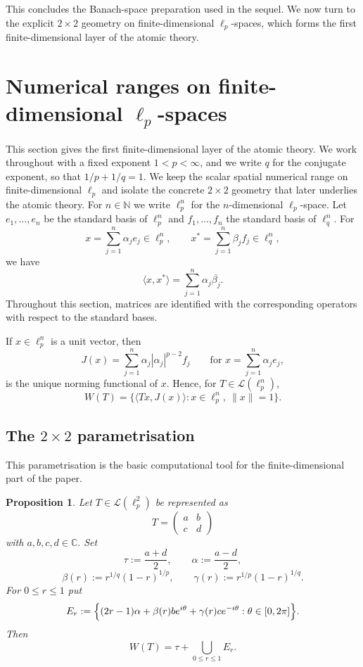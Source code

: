 \documentclass[11pt]{amsart}
\numberwithin{equation}{section}
\newtheorem{proposition}[theorem]{Proposition}
\theoremstyle{definition}
\theoremstyle{remark}
\newcommand{\C}{\mathbb{C}}
\newcommand{\N}{\mathbb{N}}
\newcommand{\ip}[2]{\langle #1,#2\rangle}
\begin{document}
This concludes the Banach-space preparation used in the sequel. We now turn to the explicit $2\times2$ geometry on finite-dimensional $\ell_p$-spaces, which forms the first finite-dimensional layer of the atomic theory.



\section{Numerical ranges on finite-dimensional $\ell_p$-spaces}\label{secfinite}

This section gives the first finite-dimensional layer of the atomic theory. We work throughout with a fixed exponent $1<p<\infty$, and we write $q$ for the conjugate exponent, so that $1/p+1/q=1$. We keep the scalar spatial numerical range on finite-dimensional $\ell_p$ and isolate the concrete $2\times 2$ geometry that later underlies the atomic theory.
For $n\in\N$ we write $\ell_p^n$ for the $n$-dimensional $\ell_p$-space.
Let $e_1,\dots,e_n$ be the standard basis of $\ell_p^n$ and $f_1,\dots,f_n$ the standard basis of $\ell_q^n$.
For
\[
x=\sum_{j=1}^n \alpha_j e_j\in \ell_p^n,
\qquad
x^*=\sum_{j=1}^n \beta_j f_j\in \ell_q^n,
\]
we have
\begin{equation}\label{dual}
\ip{x}{x^*}=\sum_{j=1}^n \alpha_j\overline{\beta_j}.
\end{equation}
Throughout this section, matrices are identified with the corresponding
operators with respect to the standard bases.

If $x\in \ell_p^n$ is a unit vector, then
\[
J(x)=\sum_{j=1}^n \alpha_j|\alpha_j|^{p-2}f_j
\qquad\text{for }x=\sum_{j=1}^n \alpha_j e_j,
\]
is the unique norming functional of $x$. Hence, for $T\in \mathcal L(\ell_p^n)$,
\[
W(T)=\{\ip{Tx}{J(x)}: x\in \ell_p^n,\ \|x\|=1\}.
\]


\subsection{The $2\times 2$ parametrisation}

This parametrisation is the basic computational tool for the finite-dimensional
part of the paper.

\begin{proposition}\label{prop:lp2-reduction}
Let $T\in\mathcal L(\ell_p^2)$ be represented as
\[
T=
\begin{pmatrix}
a & b\\
c & d
\end{pmatrix}
\]
with $a,b,c,d \in \mathbb C.$ Set
\[
\tau:=\frac{a+d}{2},\qquad
\alpha:=\frac{a-d}{2},
\]
\[
\beta(r):=r^{1/q}(1-r)^{1/p},\qquad
\gamma(r):=r^{1/p}(1-r)^{1/q}.
\]
For $0\le r\le1$ put
\begin{equation}\label{er}
E_r:=\Bigl\{(2r-1)\alpha+\beta(r)be^{i\theta}
        +\gamma(r)ce^{-i\theta}:\theta\in [0,2\pi]\Bigr\}.
\end{equation}
Then
\[
W(T)=\tau+\bigcup_{0\le r\le1}E_r.
\]
\end{proposition}
\end{document}
